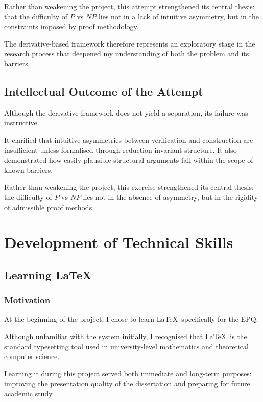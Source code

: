 \documentclass[12pt]{article}
\begin{document}
Rather than weakening the project, this attempt strengthened its central thesis: that the difficulty of $P$ vs $NP$ lies not in a lack of intuitive asymmetry, but in the constraints imposed by proof methodology.

The derivative-based framework therefore represents an exploratory stage in the research process that deepened my understanding of both the problem and its barriers.

\subsection{Intellectual Outcome of the Attempt}

Although the derivative framework does not yield a separation, its failure was instructive.

It clarified that intuitive asymmetries between verification and construction are insufficient unless formalised through reduction-invariant structure. It also demonstrated how easily plausible structural arguments fall within the scope of known barriers.

Rather than weakening the project, this exercise strengthened its central thesis: the difficulty of $P$ vs $NP$ lies not in the absence of asymmetry, but in the rigidity of admissible proof methods.

\section{Development of Technical Skills}

\subsection{Learning \LaTeX}

\subsubsection*{Motivation}

At the beginning of the project, I chose to learn \LaTeX\ specifically for the EPQ.

Although unfamiliar with the system initially, I recognised that \LaTeX\ is the standard typesetting tool used in university-level mathematics and theoretical computer science.

Learning it during this project served both immediate and long-term purposes: improving the presentation quality of the dissertation and preparing for future academic study.
\end{document}
